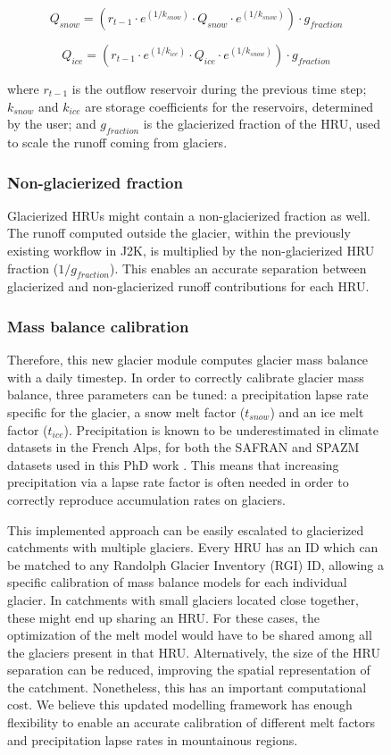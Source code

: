 \begin{figure}[h]
\begin{equation} \label{hydro:eq:16}
Q_{snow} = (r_{t-1 }\cdot e^{(1/k_{snow})} \cdot Q_{snow} \cdot e^{(1/k_{snow})}) \cdot g_{fraction}
\end{equation} 

\begin{equation} \label{hydro:eq:17}
Q_{ice} = (r_{t-1} \cdot e^{(1/k_{ice})} \cdot Q_{ice} \cdot e^{(1/k_{snow})}) \cdot g_{fraction}
\end{equation} 

where $r_{t-1}$ is the outflow reservoir during the previous time step; $k_{snow}$ and $k_{ice}$ are storage coefficients for the reservoirs, determined by the user; and $g_{fraction}$ is the glacierized fraction of the HRU, used to scale the runoff coming from glaciers. 

\subsubsection{Non-glacierized fraction}

Glacierized HRUs might contain a non-glacierized fraction as well. The runoff computed outside the glacier, within the previously existing workflow in J2K, is multiplied by the non-glacierized HRU fraction ($1/g_{fraction}$). This enables an accurate separation between glacierized and non-glacierized runoff contributions for each HRU. 

\subsubsection{Mass balance calibration}

Therefore, this new glacier module computes glacier mass balance with a daily timestep. In order to correctly calibrate glacier mass balance, three parameters can be tuned: a precipitation lapse rate specific for the glacier, a snow melt factor ($t_{snow}$) and an ice melt factor ($t_{ice}$). Precipitation is known to be underestimated in climate datasets in the French Alps, for both the SAFRAN and SPAZM datasets used in this PhD work \citep{vionnet_numerical_2016}. This means that increasing precipitation via a lapse rate factor is often needed in order to correctly reproduce accumulation rates on glaciers. 

This implemented approach can be easily escalated to glacierized catchments with multiple glaciers. Every HRU has an ID which can be matched to any Randolph Glacier Inventory (RGI) ID, allowing a specific calibration of mass balance models for each individual glacier. In catchments with small glaciers located close together, these might end up sharing an HRU. For these cases, the optimization of the melt model would have to be shared among all the glaciers present in that HRU. Alternatively, the size of the HRU separation can be reduced, improving the spatial representation of the catchment. Nonetheless, this has an important computational cost. We believe this updated modelling framework has enough flexibility to enable an accurate calibration of different melt factors and precipitation lapse rates in mountainous regions. 


\end{figure}
